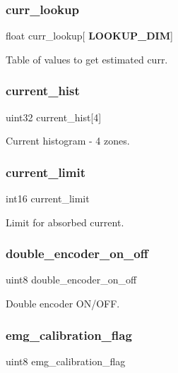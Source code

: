 \subsubsection{curr\+\_\+lookup}
{\footnotesize\ttfamily float curr\+\_\+lookup[\textbf{ L\+O\+O\+K\+U\+P\+\_\+\+D\+IM}]}

Table of values to get estimated curr. \mbox{\label{structst__mem_a5fbf9566abdebf78712e7986d399e749}} 
\subsubsection{current\+\_\+hist}
{\footnotesize\ttfamily uint32 current\+\_\+hist[4]}

Current histogram -\/ 4 zones. \mbox{\label{structst__mem_a96f2aec80e40c1bbe82186a4261ab7ac}} 
\subsubsection{current\+\_\+limit}
{\footnotesize\ttfamily int16 current\+\_\+limit}

Limit for absorbed current. \mbox{\label{structst__mem_a3d5832272cab9dc9f831471a9634b43e}} 
\subsubsection{double\+\_\+encoder\+\_\+on\+\_\+off}
{\footnotesize\ttfamily uint8 double\+\_\+encoder\+\_\+on\+\_\+off}

Double encoder O\+N/\+O\+FF. \mbox{\label{structst__mem_a78f0b0c6db2a7118cd15ec0aa38ccdb9}} 
\subsubsection{emg\+\_\+calibration\+\_\+flag}
{\footnotesize\ttfamily uint8 emg\+\_\+calibration\+\_\+flag}

